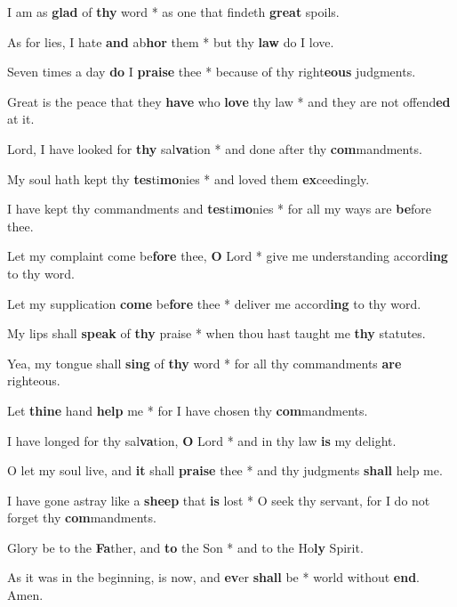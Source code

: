\begin{multicols}{2}
	I am as \textbf{glad} of \textbf{thy} word * as one that findeth \textbf{great} spoils.
	
	As for lies, I hate \textbf{and} ab\textbf{hor} them * but thy \textbf{law} do I love.
	
	Seven times a day \textbf{do} I \textbf{praise} thee * because of thy right\textbf{eous} judgments.
	
	Great is the peace that they \textbf{have} who \textbf{love} thy law * and they are not offend\textbf{ed} at it.
	
	Lord, I have looked for \textbf{thy} sal\textbf{va}tion * and done after thy \textbf{com}mandments.
	
	My soul hath kept thy \textbf{tes}ti\textbf{mo}nies * and loved them \textbf{ex}ceedingly.
	
	I have kept thy commandments and \textbf{tes}ti\textbf{mo}nies * for all my ways are \textbf{be}fore thee.
	
	Let my complaint come be\textbf{fore} thee, \textbf{O} Lord * give me understanding accord\textbf{ing} to thy word.
	
	Let my supplication \textbf{come} be\textbf{fore} thee * deliver me accord\textbf{ing} to thy word.
	
	My lips shall \textbf{speak} of \textbf{thy} praise * when thou hast taught me \textbf{thy} statutes.
	
	Yea, my tongue shall \textbf{sing} of \textbf{thy} word * for all thy commandments \textbf{are} righteous.
	
	Let \textbf{thine} hand \textbf{help} me * for I have chosen thy \textbf{com}mandments.
	
	I have longed for thy sal\textbf{va}tion, \textbf{O} Lord * and in thy law \textbf{is} my delight.
	
	O let my soul live, and \textbf{it} shall \textbf{praise} thee * and thy judgments \textbf{shall} help me.
	
	I have gone astray like a \textbf{sheep} that \textbf{is} lost * O seek thy servant, for I do not forget thy \textbf{com}mandments.
	
	Glory be to the \textbf{Fa}ther, and \textbf{to} the Son * and to the Ho\textbf{ly} Spirit.
	
	As it was in the beginning, is now, and \textbf{ev}er \textbf{shall} be * world without \textbf{end}. Amen.
\end{multicols}